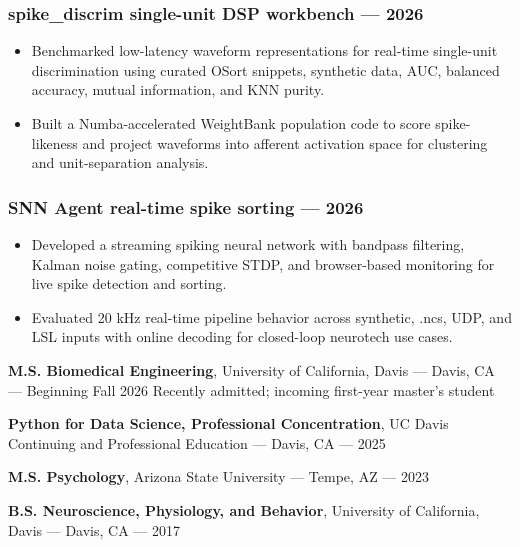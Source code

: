 \documentclass[11pt]{article}
\renewcommand{\subsection}[1]{\par\medskip\noindent{\sffamily\bfseries\fontsize{11pt}{0}\selectfont #1}\par\smallskip}
\begin{document}
\subsubsection{spike\_discrim single-unit DSP workbench ---
2026}\label{spike_discrim-single-unit-dsp-workbench-2026}

\begin{itemize}
\item Benchmarked low-latency waveform representations for real-time single-unit discrimination using curated OSort snippets, synthetic data, AUC, balanced accuracy, mutual information, and KNN purity.\item Built a Numba-accelerated WeightBank population code to score spike-likeness and project waveforms into afferent activation space for clustering and unit-separation analysis.\end{itemize}

\subsubsection{SNN Agent real-time spike sorting ---
2026}\label{snn-agent-real-time-spike-sorting-2026}

\begin{itemize}
\item Developed a streaming spiking neural network with bandpass filtering, Kalman noise gating, competitive STDP, and browser-based monitoring for live spike detection and sorting.\item Evaluated 20 kHz real-time pipeline behavior across synthetic, .ncs, UDP, and LSL inputs with online decoding for closed-loop neurotech use cases.\end{itemize}

\subsection{Education}\label{education}

\textbf{M.S. Biomedical Engineering}, University of California, Davis
--- Davis, CA --- Beginning Fall 2026 Recently admitted; incoming
first-year master's student

\textbf{Python for Data Science, Professional Concentration}, UC Davis
Continuing and Professional Education --- Davis, CA --- 2025

\textbf{M.S. Psychology}, Arizona State University --- Tempe, AZ ---
2023

\textbf{B.S. Neuroscience, Physiology, and Behavior}, University of
California, Davis --- Davis, CA --- 2017
\end{document}

